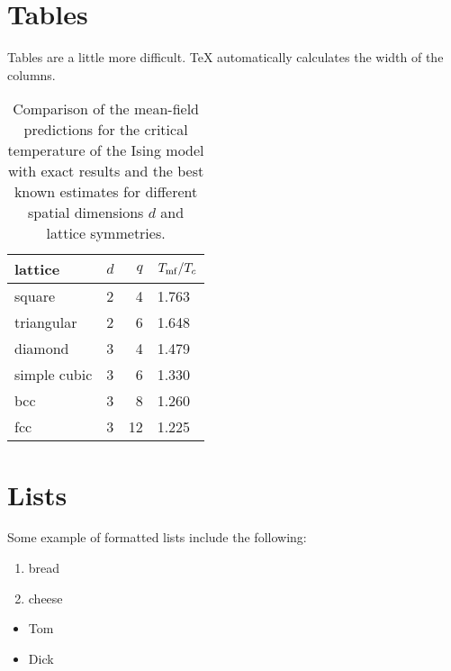 \documentclass[12pt]{article}
\begin{document}
\section{Tables}
Tables are a little more difficult. TeX
automatically calculates the width of the columns.

\begin{table}[h]
  \begin{center}
    \begin{tabular}{|l|l|r|l|}
      \hline
      lattice & $d$ & $q$ & $T_{\rm mf}/T_c$ \\
      \hline
      square & 2 & 4 & 1.763 \\
      \hline
      triangular & 2 & 6 & 1.648 \\
      \hline
      diamond & 3 & 4 & 1.479 \\
      \hline
      simple cubic & 3 & 6 & 1.330 \\
      \hline
      bcc & 3 & 8 & 1.260 \\
      \hline
      fcc & 3 & 12 & 1.225 \\
      \hline
    \end{tabular}
    \caption{\label{tab:5/tc}Comparison of the mean-field predictions
      for the critical temperature of the Ising model with exact results
      and the best known estimates for different spatial dimensions $d$
    and lattice symmetries.}
  \end{center}
\end{table}

\section{Lists}

Some example of formatted lists include the
following:

\begin{enumerate}

  \item bread

  \item cheese

\end{enumerate}

\begin{itemize}

  \item Tom

  \item Dick

\end{itemize}
\end{document}

